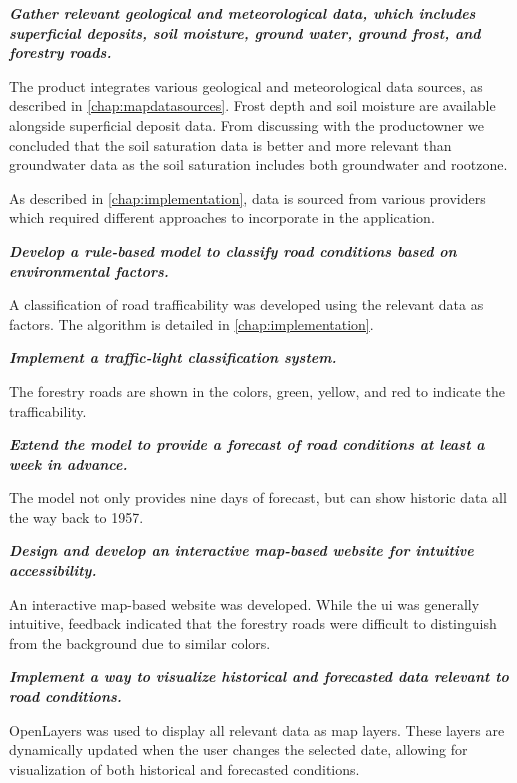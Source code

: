 \textbf{\textit{Gather relevant geological and meteorological data, which includes
superficial deposits, soil moisture, ground water, ground frost, and
forestry roads.}}

The product integrates various geological and meteorological data sources, as described in \autoref{chap:mapdatasources}. Frost depth and soil moisture are available alongside superficial deposit data. From discussing with the \Gls{productowner} we concluded that the soil saturation data is better and more relevant than groundwater data as the soil saturation includes both \gls{groundwater} and \gls{rootzone}. 

\textbf{} 

As described in \autoref{chap:implementation}, data is sourced from various providers which required different approaches to incorporate in the application. 

\textbf{\textit{Develop a rule-based model to classify road conditions based on environmental factors.}}

A classification of road trafficability was developed using the relevant data as factors. The algorithm is detailed in \autoref{chap:implementation}.

\textbf{\textit{Implement a traffic-light classification system.}}

The forestry roads are shown in the colors, green, yellow, and red to indicate the trafficability.

\textbf{\textit{Extend the model to provide a forecast of road conditions at least a week in advance.}}

The model not only provides nine days of forecast, but can show historic data all the way back to 1957.

\textbf{\textit{Design and develop an interactive map-based website for intuitive accessibility.}}

An interactive map-based website was developed. While the \acrshort{ui} was generally intuitive, feedback indicated that the forestry roads were difficult to distinguish from the background due to similar colors.  

\textbf{\textit{Implement a way to visualize historical and forecasted data relevant to road conditions.}}

OpenLayers was used to display all relevant data as map layers. These layers are dynamically updated when the user changes the selected date, allowing for visualization of both historical and forecasted conditions.

